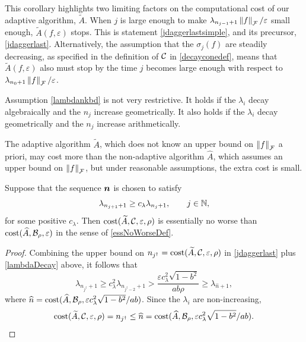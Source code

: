 \documentclass[graybox,footinfo]{svmult}
\newcommand{\DHJRnorm}[2][{}]{\ensuremath{\left \lVert #2 \right \rVert}_{#1}}
\begin{document}
This corollary highlights two limiting factors on the computational cost of our adaptive algorithm, $\widetilde{A}$. When $j$ is large enough to make $\lambda_{n_{j-1}+1}\DHJRnorm[\calF]{f}/\varepsilon$ small enough, $\widetilde{A}(f,\varepsilon)$ stops.  This is statement \eqref{jdaggerlastsimple}, and its precursor, \eqref{jdaggerlast}.  Alternatively, the assumption that the $\sigma_j(f)$ are steadily decreasing, as specified in the definition of ${\mathcal{C}}$ in \eqref{decayconedef}, means that $\widetilde{A}(f,\varepsilon)$ also must stop by the time $j$ becomes large enough with respect to $\lambda_{n_0+1}\DHJRnorm[\calF]{f}/\varepsilon$.

Assumption \eqref{lambdankbd} is not very restrictive.  It holds if the $\lambda_i$ decay algebraically and the $n_j$ increase geometrically.  It also holds if the $\lambda_i$ decay geometrically and the $n_j$ increase arithmetically.

The adaptive algorithm $\widetilde{A}$, which does not know an upper bound on $\DHJRnorm[\calF]{f}$ a priori, may cost more than the non-adaptive algorithm $\widehat{A}$, which assumes an upper bound on $\DHJRnorm[\calF]{f}$, but under reasonable assumptions, the extra cost is small.

\begin{corollary} \label{cor:tAsameCosthA} Suppose that the sequence ${\boldsymbol{n}}$ is chosen to satisfy
\begin{equation} \label{lambdaDecay}
\lambda_{n_{j+1}+1} \ge c_\lambda \lambda_{n_j+1}, \qquad j \in \bbN, 
\end{equation}
for some positive $c_\lambda$.  Then $\textup{cost}(\widetilde{A},{\mathcal{C}}, \varepsilon,\rho)$ is essentially no worse than \linebreak[4]
$\textup{cost}(\widehat{A},{\mathcal{B}}_{\rho},\varepsilon)$ in the sense of \eqref{essNoWorseDef}. 
\end{corollary}

\begin{proof}
Combining the upper bound on $n_{j^\dagger} = \textup{cost}(\widetilde{A},{\mathcal{C}},\varepsilon,\rho)$ in \eqref{jdaggerlast} plus  \eqref{lambdaDecay} above, it follows that
\begin{equation*}
\lambda_{n_{j^\dagger}+1} \ge c_{\lambda}^2 \lambda_{n_{j^\dagger-2}+1} > \frac{\varepsilon c_{\lambda}^2\sqrt{1 - b^2}}{ab \rho} \ge \lambda_{\widehat{n}+1},
\end{equation*}
where $\widehat{n}
= \textup{cost}(\widehat{A},{\mathcal{B}}_{\rho},\varepsilon c_{\lambda}^2\sqrt{1 - b^2}/ab)$.
Since the $\lambda_i$ are non-increasing,
\begin{equation*}
\textup{cost}(\widetilde{A},{\mathcal{C}},\varepsilon,\rho) = n_{j^\dagger} \le \widehat{n} = \textup{cost}(\widehat{A},{\mathcal{B}}_{\rho},\varepsilon c_{\lambda}^2\sqrt{1 - b^2}/ab).
\end{equation*}
\end{proof}
\end{document}
